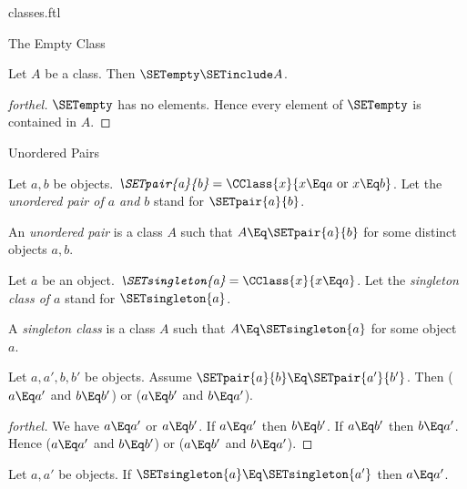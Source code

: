 \documentclass{stex}
\begin{document}
\begin{smodule}{classes.ftl}
\begin{sfragment}{The Empty Class}
  \begin{corollary}[forthel]
    Let $A$ be a class.
    Then $\SETempty \SETinclude A$.
  \end{corollary}
  \begin{proof}[forthel]
    $\SETempty$ has no elements.
    Hence every element of $\SETempty$ is contained in $A$.
  \end{proof}
\end{sfragment}

\begin{sfragment}{Unordered Pairs}
  \begin{definition}[forthel,for={SETpair,unordered pair}]
    Let $a, b$ be objects.
    $\emph{\SETpair{a}{b}} = \CClass{x}{x \Eq a\text{ or }x \Eq b}$.
    Let the \emph{unordered pair of $a$ and $b$} stand for $\SETpair{a}{b}$.
  \end{definition}

  \begin{definition}[forthel,for=unordered pair]
    An \emph{unordered pair} is a class $A$ such that $A \Eq \SETpair{a}{b}$ for some distinct objects $a, b$.
  \end{definition}

  \begin{definition}[forthel,for={SETsingleton,singleton class}]
    Let $a$ be an object.
    $\emph{\SETsingleton{a}} = \CClass{x}{x \Eq a}$.
    Let the \emph{singleton class of $a$} stand for $\SETsingleton{a}$.
  \end{definition}

  \begin{definition}[forthel,for=singleton class]
    A \emph{singleton class} is a class $A$ such that $A \Eq \SETsingleton{a}$ for some object $a$.
  \end{definition}

  \begin{proposition}[forthel]
    Let $a, a', b, b'$ be objects.
    Assume $\SETpair{a}{b} \Eq \SETpair{a'}{b'}$.
    Then ($a \Eq a'$ and $b \Eq b'$) or ($a \Eq b'$ and $b \Eq a'$).
  \end{proposition}
  \begin{proof}[forthel]
    We have $a \Eq a'$ or $a \Eq b'$.
    If $a \Eq a'$ then $b \Eq b'$.
    If $a \Eq b'$ then $b \Eq a'$.
    Hence ($a \Eq a'$ and $b \Eq b'$) or ($a \Eq b'$ and $b \Eq a'$).
  \end{proof}

  \begin{corollary}[forthel]
    Let $a, a'$ be objects.
    If $\SETsingleton{a} \Eq \SETsingleton{a'}$ then $a \Eq a'$.
  \end{corollary}


\end{sfragment}
\end{smodule}
\end{document}
